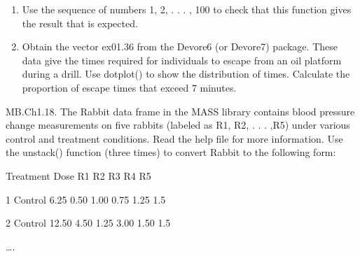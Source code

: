 \documentclass[
]{article}
\begin{document}
\begin{enumerate}
\def\labelenumi{(\alph{enumi})}
\item
  Use the sequence of numbers 1, 2, . . . , 100 to check that this
  function gives the result that is expected.
\item
  Obtain the vector ex01.36 from the Devore6 (or Devore7) package. These
  data give the times required for individuals to escape from an oil
  platform during a drill. Use dotplot() to show the distribution of
  times. Calculate the proportion of escape times that exceed 7 minutes.
\end{enumerate}

MB.Ch1.18. The Rabbit data frame in the MASS library contains blood
pressure change measurements on five rabbits (labeled as R1, R2, . . .
,R5) under various control and treatment conditions. Read the help file
for more information. Use the unstack() function (three times) to
convert Rabbit to the following form:

Treatment Dose R1 R2 R3 R4 R5

1 Control 6.25 0.50 1.00 0.75 1.25 1.5

2 Control 12.50 4.50 1.25 3.00 1.50 1.5

\ldots.
\end{document}
